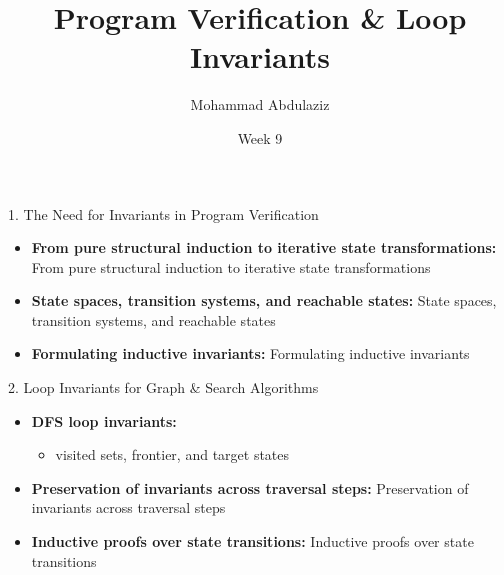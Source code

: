 \documentclass[compress,10pt,xcolor=dvipsnames]{beamer}
\title[Program Verification & Loop Invariants]{Program Verification & Loop Invariants}
\author[7CCSACTP]{Mohammad Abdulaziz}
\date{Week 9}
\begin{document}

\begin{frame}{1. The Need for Invariants in Program Verification}

\begin{itemize}
  \item \textbf{From pure structural induction to iterative state transformations:} From pure structural induction to iterative state transformations
  \item \textbf{State spaces, transition systems, and reachable states:} State spaces, transition systems, and reachable states
  \item \textbf{Formulating inductive invariants:} Formulating inductive invariants
\end{itemize}
\end{frame}

\begin{frame}{2. Loop Invariants for Graph & Search Algorithms}

\begin{itemize}
  \item \textbf{DFS loop invariants:}
    \begin{itemize}
      \item visited sets, frontier, and target states
    \end{itemize}
  \item \textbf{Preservation of invariants across traversal steps:} Preservation of invariants across traversal steps
  \item \textbf{Inductive proofs over state transitions:} Inductive proofs over state transitions
\end{itemize}
\end{frame}
\end{document}

